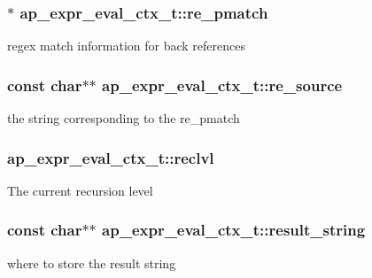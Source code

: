\subsubsection[{\texorpdfstring{re\+\_\+pmatch}{re_pmatch}}]{$\ast$ ap\+\_\+expr\+\_\+eval\+\_\+ctx\+\_\+t\+::re\+\_\+pmatch}\hypertarget{structap__expr__eval__ctx__t_a2fb26ba0831f65b26b8c84f0275e4183}{}\label{structap__expr__eval__ctx__t_a2fb26ba0831f65b26b8c84f0275e4183}
regex match information for back references 
\subsubsection[{\texorpdfstring{re\+\_\+source}{re_source}}]{\setlength{\rightskip}{0pt plus 5cm}const char$\ast$$\ast$ ap\+\_\+expr\+\_\+eval\+\_\+ctx\+\_\+t\+::re\+\_\+source}\hypertarget{structap__expr__eval__ctx__t_a0337d6d73ed1d6b0cebdc89dd1723d6f}{}\label{structap__expr__eval__ctx__t_a0337d6d73ed1d6b0cebdc89dd1723d6f}
the string corresponding to the re\+\_\+pmatch 
\subsubsection[{\texorpdfstring{reclvl}{reclvl}}]{ ap\+\_\+expr\+\_\+eval\+\_\+ctx\+\_\+t\+::reclvl}\hypertarget{structap__expr__eval__ctx__t_ac3a8f194fc0c881a55ad7074e9bcc92b}{}\label{structap__expr__eval__ctx__t_ac3a8f194fc0c881a55ad7074e9bcc92b}
The current recursion level 
\subsubsection[{\texorpdfstring{result\+\_\+string}{result_string}}]{\setlength{\rightskip}{0pt plus 5cm}const char$\ast$$\ast$ ap\+\_\+expr\+\_\+eval\+\_\+ctx\+\_\+t\+::result\+\_\+string}\hypertarget{structap__expr__eval__ctx__t_af5eb995e550d9073c1f51ecb2078e108}{}\label{structap__expr__eval__ctx__t_af5eb995e550d9073c1f51ecb2078e108}
where to store the result string 
